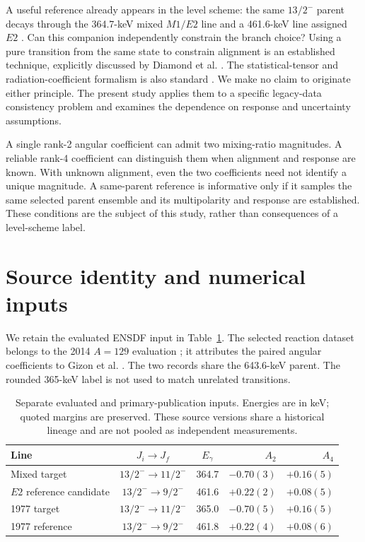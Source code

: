 \documentclass[pdflatex,iicol,sn-mathphys-num]{sn-jnl}
\begin{document}
A useful reference already appears in the level scheme: the same \(13/2^-\) parent decays through the 364.7-keV mixed \(M1/E2\) line and a 461.6-keV line assigned \(E2\) \cite{Timar2014}. Can this companion independently constrain the branch choice? Using a pure transition from the same state to constrain alignment is an established technique, explicitly discussed by Diamond et al. \cite{Diamond1966}. The statistical-tensor and radiation-coefficient formalism is also standard \cite{Yamazaki1967,DerMateosian1974}. We make no claim to originate either principle. The present study applies them to a specific legacy-data consistency problem and examines the dependence on response and uncertainty assumptions.

A single rank-2 angular coefficient can admit two mixing-ratio magnitudes. A reliable rank-4 coefficient can distinguish them when alignment and response are known. With unknown alignment, even the two coefficients need not identify a unique magnitude. A same-parent reference is informative only if it samples the same selected parent ensemble and its multipolarity and response are established. These conditions are the subject of this study, rather than consequences of a level-scheme label.

\section{Source identity and numerical inputs}

We retain the evaluated ENSDF input in Table~\ref{tab:input}. The selected reaction dataset belongs to the 2014 \(A=129\) evaluation \cite{Timar2014}; it attributes the paired angular coefficients to Gizon et al. \cite{Gizon1977}. The two records share the 643.6-keV parent. The rounded 365-keV label is not used to match unrelated transitions.

\begin{table}[t]
\centering
\caption{Separate evaluated and primary-publication inputs. Energies are in keV; quoted margins are preserved. These source versions share a historical lineage and are not pooled as independent measurements.}
\label{tab:input}
\begin{tabular}{@{}lccrr@{}}
\toprule
Line & \(J_i\to J_f\) & \(E_\gamma\) & \(A_2\) & \(A_4\)\\
\midrule
Mixed target & \(13/2^-\to11/2^-\) & 364.7 & \(-0.70(3)\) & \(+0.16(5)\)\\
\(E2\) reference candidate & \(13/2^-\to9/2^-\) & 461.6 & \(+0.22(2)\) & \(+0.08(5)\)\\
\midrule
1977 target & \(13/2^-\to11/2^-\) & 365.0 & \(-0.70(5)\) & \(+0.16(5)\)\\
1977 reference & \(13/2^-\to9/2^-\) & 461.8 & \(+0.22(4)\) & \(+0.08(6)\)\\
\bottomrule
\end{tabular}
\end{table}
\end{document}
